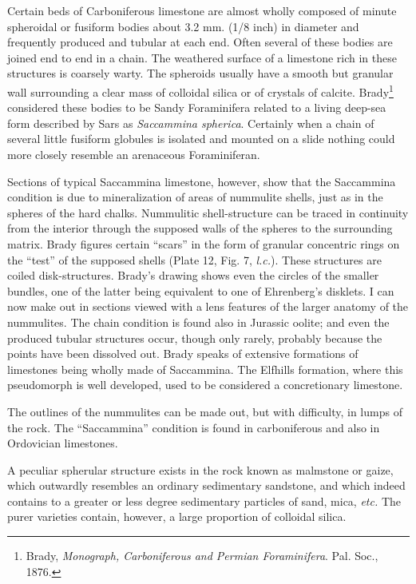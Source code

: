 \documentclass[a4paper, 12pt, oneside]{article}
\begin{document}
Certain beds of Carboniferous limestone are almost wholly composed of minute spheroidal or fusiform bodies about 3.2 mm. (1/8 inch) in diameter and frequently produced and tubular at each end. Often several of these bodies are joined end to end in a chain. The weathered surface of a limestone rich in these structures is coarsely warty. The spheroids usually have a smooth but granular wall surrounding a clear mass of colloidal silica or of crystals of calcite. Brady\footnote{Brady, \emph{Monograph, Carboniferous and Permian Foraminifera}. Pal. Soc., 1876.} considered these bodies to be Sandy Foraminifera related to a living deep-sea form described by Sars as \emph{Saccammina spherica}. Certainly when a chain of several little fusiform globules is isolated and mounted on a slide nothing could more closely resemble an arenaceous Foraminiferan.

Sections of typical Saccammina limestone, however, show that the Saccammina condition is due to mineralization of areas of nummulite shells, just as in the spheres of the hard chalks. Nummulitic shell-structure can be traced in continuity from the interior through the supposed walls of the spheres to the surrounding matrix. Brady figures certain ``scars'' in the form of granular concentric rings on the ``test'' of the supposed shells (Plate 12, Fig. 7, \emph{l.c.}). These structures are coiled disk-structures. Brady's drawing shows even the circles of the smaller bundles, one of the latter being equivalent to one of Ehrenberg's disklets. I can now make out in sections viewed with a lens features of the larger anatomy of the nummulites. The chain condition is found also in Jurassic oolite; and even the produced tubular structures occur, though only rarely, probably because the points have been dissolved out. Brady speaks of extensive formations of limestones being wholly made of Saccammina. The Elfhills formation, where this pseudomorph is well developed, used to be considered a concretionary limestone.

The outlines of the nummulites can be made out, but with difficulty, in lumps of the rock. The ``Saccammina'' condition is found in carboniferous and also in Ordovician limestones.

A peculiar spherular structure exists in the rock known as malmstone or gaize, which outwardly resembles an ordinary sedimentary sandstone, and which indeed contains to a greater or less degree sedimentary particles of sand, mica, \emph{etc.} The purer varieties contain, however, a large proportion of colloidal silica.
\end{document}
